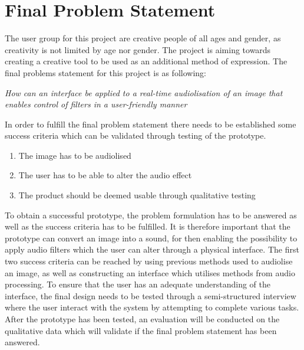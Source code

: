 \chapter{Final Problem Statement}\label{ch:finalproblem}

The user group for this project are creative people of all ages and gender, as creativity is not limited by age nor gender. The project is aiming towards creating a creative tool to be used as an additional method of expression. 
The final problems statement for this project is as following:



\textit{How can an interface be applied to a real-time audiolisation of an image that enables control of filters in a user-friendly manner}



In order to fulfill the final problem statement there needs to be established some success criteria which can be validated through testing of the prototype. 
\begin{enumerate}
\item The image has to be audiolised 
\item The user has to be able to alter the audio effect 
\item The product should be deemed usable through qualitative testing
\end{enumerate}

To obtain a successful prototype, the problem formulation has to be answered as well as the success criteria has to be fulfilled. It is therefore important that the prototype can convert an image into a sound, for then enabling the possibility to apply audio filters which the user can alter through a physical interface. The first two success criteria can be reached by using previous methods used to audiolise an image, as well as constructing an interface which utilises methods from audio processing. To ensure that the user has an adequate understanding of the interface, the final design needs to be tested through a semi-structured interview where the user interact with the system by attempting to complete various tasks. After the prototype has been tested, an evaluation will be conducted on the qualitative data which will validate if the final problem statement has been answered.  

